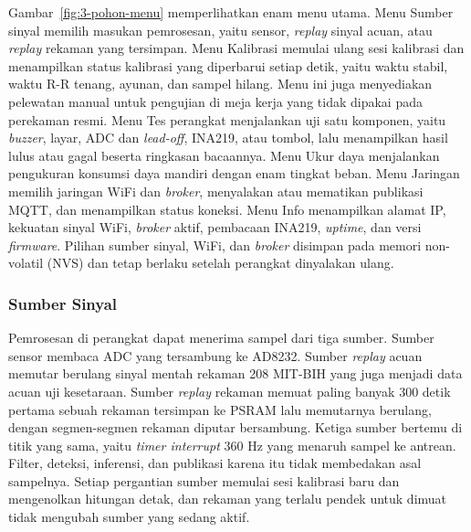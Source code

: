 Gambar~\ref{fig:3-pohon-menu} memperlihatkan enam menu utama. Menu Sumber sinyal memilih masukan pemrosesan, yaitu sensor, \textit{replay} sinyal acuan, atau \textit{replay} rekaman yang tersimpan. Menu Kalibrasi memulai ulang sesi kalibrasi dan menampilkan status kalibrasi yang diperbarui setiap detik, yaitu waktu stabil, waktu R-R tenang, ayunan, dan sampel hilang. Menu ini juga menyediakan pelewatan manual untuk pengujian di meja kerja yang tidak dipakai pada perekaman resmi. Menu Tes perangkat menjalankan uji satu komponen, yaitu \textit{buzzer}, layar, ADC dan \textit{lead-off}, INA219, atau tombol, lalu menampilkan hasil lulus atau gagal beserta ringkasan bacaannya. Menu Ukur daya menjalankan pengukuran konsumsi daya mandiri dengan enam tingkat beban. Menu Jaringan memilih jaringan WiFi dan \textit{broker}, menyalakan atau mematikan publikasi MQTT, dan menampilkan status koneksi. Menu Info menampilkan alamat IP, kekuatan sinyal WiFi, \textit{broker} aktif, pembacaan INA219, \textit{uptime}, dan versi \textit{firmware}. Pilihan sumber sinyal, WiFi, dan \textit{broker} disimpan pada memori non-volatil (NVS) dan tetap berlaku setelah perangkat dinyalakan ulang.

\subsubsection{Sumber Sinyal}

Pemrosesan di perangkat dapat menerima sampel dari tiga sumber. Sumber sensor membaca ADC yang tersambung ke AD8232. Sumber \textit{replay} acuan memutar berulang sinyal mentah rekaman 208 MIT-BIH yang juga menjadi data acuan uji kesetaraan. Sumber \textit{replay} rekaman memuat paling banyak 300 detik pertama sebuah rekaman tersimpan ke PSRAM lalu memutarnya berulang, dengan segmen-segmen rekaman diputar bersambung. Ketiga sumber bertemu di titik yang sama, yaitu \textit{timer interrupt} 360 Hz yang menaruh sampel ke antrean. Filter, deteksi, inferensi, dan publikasi karena itu tidak membedakan asal sampelnya. Setiap pergantian sumber memulai sesi kalibrasi baru dan mengenolkan hitungan detak, dan rekaman yang terlalu pendek untuk dimuat tidak mengubah sumber yang sedang aktif.

